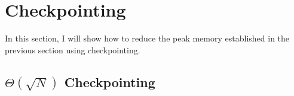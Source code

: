 \section{Checkpointing} \label{sec:bg-checkpointing}
In this section, I will show how to reduce the peak memory established in the previous section using checkpointing.

\subsection{\texorpdfstring{\(\Theta(\sqrt{N})\)}{\textit{O(sqrt(N))}} Checkpointing}

